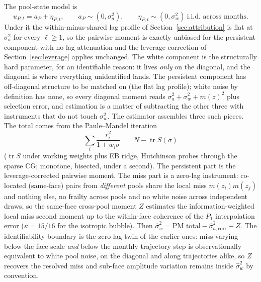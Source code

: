 \documentclass[11pt]{article}
\begin{document}
The pool-state model is
\[
u_{P,t}=a_P+\eta_{P,t},\qquad a_P\sim(0,\sigma_a^2),\qquad
\eta_{P,t}\sim(0,\sigma_w^2)\ \text{i.i.d.\ across months.}
\]
Under it the within-minus-shared lag profile of
Section~\ref{sec:attribution} is flat at $\sigma_a^2$ for every $\ell\ge1$,
so the pairwise moment is exactly unbiased for the persistent component with
no lag attenuation and the leverage correction of
Section~\ref{sec:leverage} applies unchanged. The white component is the structurally hard parameter, for an
identifiable reason: it lives \emph{only} on the diagonal, and the diagonal
is where everything unidentified lands. The persistent component has
off-diagonal structure to be matched on (the flat lag profile); white noise
by definition has none, so every diagonal moment reads
$\sigma_a^2+\sigma_w^2+m(z)^2$ plus selection error, and estimation is a
matter of subtracting the other three with instruments that do not touch
$\sigma_w^2$. The estimator assembles three such pieces. The total comes
from the Paule--Mandel iteration
\[
\sum_i \frac{r_i^2}{1+w_i\sigma}\;=\;N-\operatorname{tr}S(\sigma)
\]
($\operatorname{tr}S$ under working weights plus EB ridge, Hutchinson probes
through the sparse CG; monotone, bisected, under a second). The persistent
part is the leverage-corrected pairwise moment. The miss part is a zero-lag
instrument: co-located (same-face) pairs from \emph{different} pools share
the local miss $m(z_i)m(z_j)$ and nothing else, no frailty across pools and
no white noise across independent draws, so the same-face cross-pool moment
$Z$ estimates the information-weighted local miss second moment up to the
within-face coherence of the $P_1$ interpolation error ($\kappa=15/16$ for
the isotropic bubble). Then
$\hat\sigma_w^2 = \text{PM total} - \hat\sigma_{a,\mathrm{corr}}^2 - Z$.
The identifiability boundary is the zero-lag twin of the earlier ones: miss
varying below the face scale \emph{and} below the monthly trajectory step is
observationally equivalent to white pool noise, on the diagonal and along
trajectories alike, so $Z$ recovers the resolved miss and sub-face amplitude
variation remains inside $\hat\sigma_w^2$ by convention.
\end{document}
